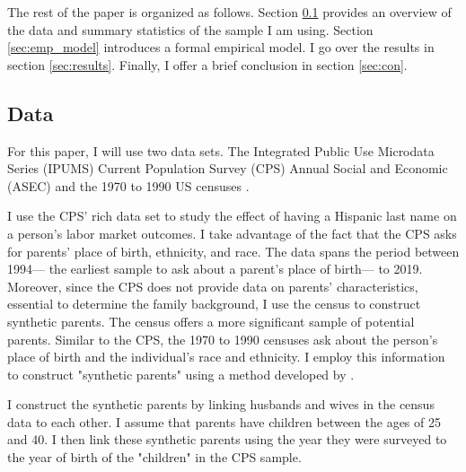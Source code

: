 \documentclass[12pt, fullpage]{article}
\begin{document}
The rest of the paper is organized as follows. Section \ref{sec:data} provides an overview of the data and summary statistics of the sample I am using. Section \ref{sec:emp_model} introduces a formal empirical model. I go over the results in section \ref{sec:results}. Finally, I offer a brief conclusion in section \ref{sec:con}.

\subsection{Data}\label{sec:data}

For this paper, I will use two data sets. The Integrated Public Use Microdata Series (IPUMS) Current Population Survey (CPS) Annual Social and Economic (ASEC) \citep{cps2019} and the 1970 to 1990 US censuses \citep{acs2019}. 

I use the CPS' rich data set to study the effect of having a Hispanic last name on a person's labor market outcomes. I take advantage of the fact that the CPS asks for parents' place of birth, ethnicity, and race. The data spans the period between 1994--- the earliest sample to ask about a parent's place of birth--- to 2019. Moreover, since the CPS does not provide data on parents' characteristics, essential to determine the family background, I use the census to construct synthetic parents. The census offers a more significant sample of potential parents. Similar to the CPS, the 1970 to 1990 censuses ask about the person's place of birth and the individual's race and ethnicity. I employ this information to construct "synthetic parents" using a method developed by \citet{rubinstein2014pride}. 

I construct the synthetic parents by linking husbands and wives in the census data to each other. I assume that parents have children between the ages of 25 and 40. I then link these synthetic parents using the year they were surveyed to the year of birth of the "children" in the CPS sample.
\end{document}
